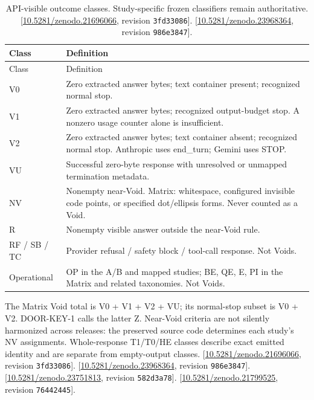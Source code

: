 \documentclass[11pt,letterpaper]{article}
\begin{document}
\begin{longtable}{p{0.85in}p{5.6in}}
\caption{API-visible outcome classes. Study-specific frozen classifiers remain authoritative. [\href{https://doi.org/10.5281/zenodo.21696066}{10.5281/zenodo.21696066}, revision \texttt{3fd33086}]. [\href{https://doi.org/10.5281/zenodo.23968364}{10.5281/zenodo.23968364}, revision \texttt{986e3847}].}\label{tab:evidence-8}\\
\toprule
Class & Definition \\ \midrule
\endfirsthead
\toprule
Class & Definition \\ \midrule
\endhead
V0 & Zero extracted answer bytes; text container present; recognized normal stop. \\
V1 & Zero extracted answer bytes; recognized output-budget stop. A nonzero usage counter alone is insufficient. \\
V2 & Zero extracted answer bytes; text container absent; recognized normal stop. Anthropic uses end\_turn; Gemini uses STOP. \\
VU & Successful zero-byte response with unresolved or unmapped termination metadata. \\
NV & Nonempty near-Void. Matrix: whitespace, configured invisible code points, or specified dot/ellipsis forms. Never counted as a Void. \\
R & Nonempty visible answer outside the near-Void rule. \\
RF / SB / TC & Provider refusal / safety block / tool-call response. Not Voids. \\
Operational & OP in the A/B and mapped studies; BE, QE, E, PI in the Matrix and related taxonomies. Not Voids. \\
\bottomrule\end{longtable}

The Matrix Void total is V0 + V1 + V2 + VU; its normal-stop subset is V0 + V2. DOOR-KEY-1 calls the latter Z. Near-Void criteria are not silently harmonized across releases: the preserved source code determines each study’s NV assignments. Whole-response T1/T0/HE classes describe exact emitted identity and are separate from empty-output classes. [\href{https://doi.org/10.5281/zenodo.21696066}{10.5281/zenodo.21696066}, revision \texttt{3fd33086}]. [\href{https://doi.org/10.5281/zenodo.23968364}{10.5281/zenodo.23968364}, revision \texttt{986e3847}]. [\href{https://doi.org/10.5281/zenodo.23751813}{10.5281/zenodo.23751813}, revision \texttt{582d3a78}]. [\href{https://doi.org/10.5281/zenodo.21799525}{10.5281/zenodo.21799525}, revision \texttt{76442445}].
\end{document}
